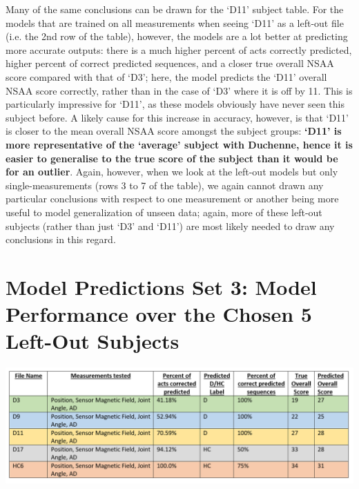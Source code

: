 \documentclass[12pt,twoside]{report}
\begin{document}
\quad Many of the same conclusions can be drawn for the ‘D11’ subject table. For the models that are trained on all measurements when seeing ‘D11’ as a left-out file (i.e. the 2nd row of the table), however, the models are a lot better at predicting more accurate outputs: there is a much higher percent of acts correctly predicted, higher percent of correct predicted sequences, and a closer true overall NSAA score compared with that of ‘D3’; here, the model predicts the ‘D11’ overall NSAA score correctly, rather than in the case of ‘D3’ where it is off by 11. This is particularly impressive for ‘D11’, as these models obviously have never seen this subject before. A likely cause for this increase in accuracy, however, is that ‘D11’ is closer to the mean overall NSAA score amongst the subject groups: \textbf{‘D11’ is more representative of the ‘average’ subject with Duchenne, hence it is easier to generalise to the true score of the subject than it would be for an outlier}. Again, however, when we look at the left-out models but only single-measurements (rows 3 to 7 of the table), we again cannot drawn any particular conclusions with respect to one measurement or another being more useful to model generalization of unseen data; again, more of these left-out subjects (rather than just ‘D3’ and ‘D11’) are most likely needed to draw any conclusions in this regard.



\section{Model Predictions Set 3: Model Performance over the Chosen 5 Left-Out Subjects}

\begin{center}
\includegraphics[scale=0.45]{project_figures/fig11_5}
\end{center}
\end{document}
